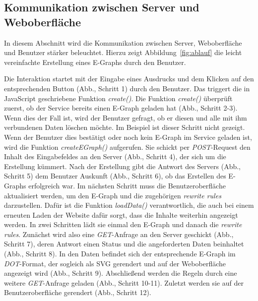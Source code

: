 \subsection{Kommunikation zwischen Server und Weboberfläche}


In diesem Abschnitt wird die Kommunikation zwischen Server, Weboberfläche und Benutzer stärker beleuchtet.
Hierzu zeigt Abbildung~\ref{fig:ablauf} die leicht vereinfachte Erstellung eines E-Graphs durch den Benutzer.


Die Interaktion startet mit der Eingabe eines Ausdrucks und dem Klicken auf den entsprechenden Button (Abb., Schritt 1) durch den Benutzer.
Das triggert die in JavaScript geschriebene Funktion \textit{create()}. 
Die Funktion \textit{create()} überprüft zuerst, ob der Service bereits einen E-Graph geladen hat (Abb., Schritt 2-3). Wenn dies der Fall ist, wird der Benutzer
gefragt, ob er diesen und alle mit ihm verbundenen Daten löschen möchte. Im Beispiel ist dieser Schritt nicht gezeigt.
Wenn der Benutzer dies bestätigt oder noch kein E-Graph im Service geladen ist, wird die Funktion \textit{createEGraph()} aufgerufen. 
Sie schickt per \textit{POST}-Request den Inhalt des Eingabefeldes an den Server (Abb., Schritt 4), der sich um die Erstellung kümmert.
Nach der Erstellung gibt die Antwort des Servers (Abb., Schritt 5) dem Benutzer Auskunft (Abb., Schritt 6), ob das Erstellen des E-Graphs erfolgreich war.
Im nächsten Schritt muss die Benutzeroberfläche aktualisiert werden, um den E-Graph und die zugehörigen \textit{rewrite rules} darzustellen.
Dafür ist die Funktion \textit{loadData()} verantwortlich, die auch bei einem erneuten Laden der Website dafür sorgt, dass die Inhalte weiterhin angezeigt werden.
In zwei Schritten lädt sie einmal den E-Graph und danach die \textit{rewrite rules}.
Zunächst wird also eine \textit{GET}-Anfrage an den Server geschickt (Abb., Schritt 7), deren Antwort einen Status und die angeforderten Daten beinhaltet (Abb., Schritt 8).
In den Daten befindet sich der entsprechende E-Graph im \textit{DOT}-Format, der sogleich als SVG gerendert und auf 
der Weboberfläche angezeigt wird (Abb., Schritt 9).
Abschließend werden die Regeln durch eine weitere \textit{GET}-Anfrage geladen (Abb., Schritt 10-11). Zuletzt werden sie auf der Benutzeroberfläche gerendert (Abb., Schritt 12).

